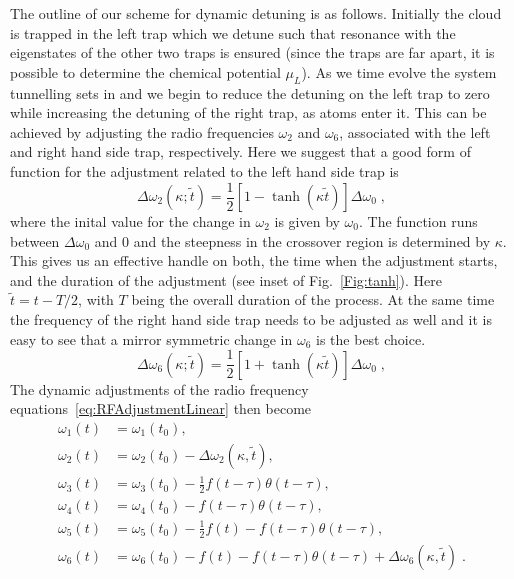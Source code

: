 The outline of our scheme for dynamic detuning is as
follows. Initially the cloud is trapped in the left trap which we
detune such that resonance with the eigenstates of the other two traps
is ensured (since the traps are far apart, it is possible to determine
the chemical potential $\mu_L$).  As we time evolve the system
tunnelling sets in and we begin to reduce the detuning on the left
trap to zero while increasing the detuning of the right trap, as atoms
enter it. This can be achieved by adjusting the radio frequencies
$\omega_2$ and $\omega_6$, associated with the left and right hand
side trap, respectively. Here we suggest that a good form of function for the 
adjustment related to the left hand side trap is
\begin{equation}
  \Delta\omega_2(\kappa;\tilde t)=\frac{1}{2}[1-\tanh(\kappa
  \tilde t)]\Delta\omega_0 \;,
\end{equation}
where the inital value for the change in $\omega_2$ is given by
$\omega_0$. The function runs between $\Delta\omega_0$ and 0 and the
steepness in the crossover region is determined by $\kappa$. This
gives us an effective handle on both, the time when the adjustment
starts, and the duration of the adjustment (see inset of
Fig.~\ref{Fig:tanh}). Here $\tilde t=t-T/2$, with $T$ being the
overall duration of the process. At the same time the frequency of the
right hand side trap needs to be adjusted as well and it is easy to
see that a mirror symmetric change in $\omega_6$ is the best choice.
\begin{equation}
  \Delta\omega_6(\kappa;\tilde t)=\frac{1}{2}[1+\tanh(\kappa
  \tilde t)]\Delta\omega_0 \;,
\end{equation}
The dynamic adjustments of the radio frequency
equations~\eqref{eq:RFAdjustmentLinear} then become
\begin{subequations}
  \begin{align}
    \omega_1(t)&=\omega_1(t_0),\\
    \omega_2(t)&=\omega_2(t_0) - \Delta\omega_2(\kappa,\tilde t),\\
    \omega_3(t)&=\omega_3(t_0)-\frac{1}{2}f(t-\tau)\theta(t-\tau),\\
    \omega_4(t)&=\omega_4(t_0)-f(t-\tau)\theta(t-\tau),\\
    \omega_5(t)&=\omega_5(t_0)-\frac{1}{2}f(t)-f(t-\tau)\theta(t-\tau),\\
    \omega_6(t)&=\omega_6(t_0)-f(t) - f(t-\tau)\theta(t-\tau) +
    \Delta\omega_6(\kappa,\tilde t)\;.
  \end{align}
\label{eq:RFAdjustmentNonLinear}
\end{subequations}

